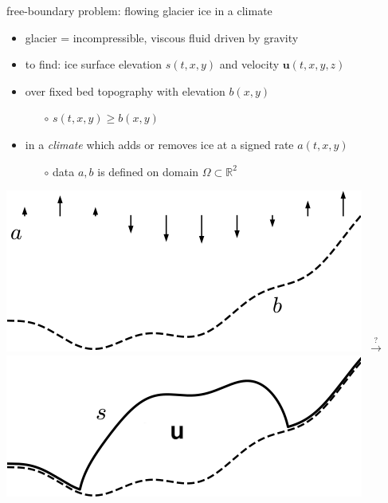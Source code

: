 \documentclass[svgnames,
               hyperref={colorlinks,citecolor=DeepPink4,linkcolor=FireBrick,urlcolor=Maroon},
               usepdftitle=false]  %
               {beamer}
\newcommand{\RR}{\mathbb{R}}
\newcommand{\bu}{\mathbf{u}}
\begin{document}
\begin{frame}{free-boundary problem: flowing glacier ice in a climate}

\begin{itemize}
\item glacier = incompressible, viscous fluid driven by gravity
\item to find: ice surface elevation $s(t,x,y)$ and velocity $\bu(t,x,y,z)$
\item over fixed bed topography with elevation $b(x,y)$
    \begin{itemize}
    \item[$\circ$] $s(t,x,y) \ge b(x,y)$
    \end{itemize}
\item in a \emph{climate} which adds or removes ice at a signed rate $a(t,x,y)$
    \begin{itemize}
    \item[$\circ$] data $a,b$ is defined on domain $\Omega \subset \RR^2$
    \end{itemize}
\end{itemize}

\bigskip
\hfill \mbox{\includegraphics[height=0.24\textheight]{../talk-oxford/images/domain-data.png} \quad $\stackrel{?}{\to}$ \quad \includegraphics[height=0.24\textheight]{../talk-oxford/images/domain-velocity.png}}
\end{frame}
\end{document}
